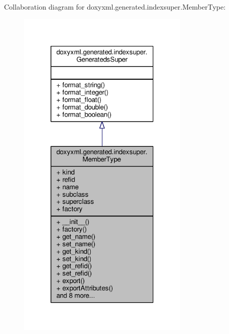 Collaboration diagram for doxyxml.\+generated.\+indexsuper.\+Member\+Type\+:
\nopagebreak
\begin{figure}[H]
\begin{center}
\leavevmode
\includegraphics[width=232pt]{d8/d8b/classdoxyxml_1_1generated_1_1indexsuper_1_1MemberType__coll__graph}
\end{center}
\end{figure}
